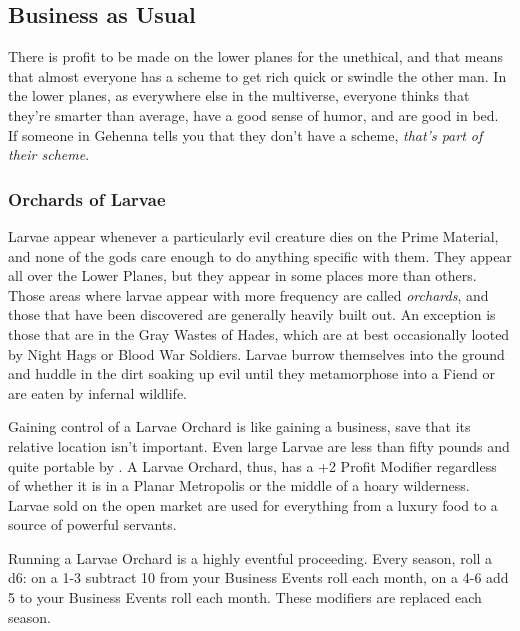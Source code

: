 

\subsection{Business as Usual}

There is profit to be made on the lower planes for the unethical, and that means that almost everyone has a scheme to get rich quick or swindle the other man. In the lower planes, as everywhere else in the multiverse, everyone thinks that they're smarter than average, have a good sense of humor, and are good in bed. If someone in Gehenna tells you that they don't have a scheme, \textit{that's part of their scheme}.

\subsubsection{Orchards of Larvae}

Larvae appear whenever a particularly evil creature dies on the Prime Material, and none of the gods care enough to do anything specific with them. They appear all over the Lower Planes, but they appear in some places more than others. Those areas where larvae appear with more frequency are called \textit{orchards}, and those that have been discovered are generally heavily built out. An exception is those that are in the Gray Wastes of Hades, which are at best occasionally looted by Night Hags or Blood War Soldiers. Larvae burrow themselves into the ground and huddle in the dirt soaking up evil until they metamorphose into a Fiend or are eaten by infernal wildlife.

Gaining control of a Larvae Orchard is like gaining a business, save that its relative location isn't important. Even large Larvae are less than fifty pounds and quite portable by . A Larvae Orchard, thus, has a +2 Profit Modifier regardless of whether it is in a Planar Metropolis or the middle of a hoary wilderness. Larvae sold on the open market are used for everything from a luxury food to a source of powerful servants.


Running a Larvae Orchard is a highly eventful proceeding. Every season, roll a d6: on a 1-3 subtract 10 from your Business Events roll each month, on a 4-6 add 5 to your Business Events roll each month. These modifiers are replaced each season.

